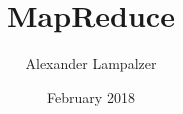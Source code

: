 \documentclass[a4paper,12pt]{book}
\begin{document}
\author{Alexander Lampalzer}
\title{MapReduce}
\date{February 2018}

\frontmatter
\maketitle
\tableofcontents

\mainmatter



\backmatter
\end{document}
